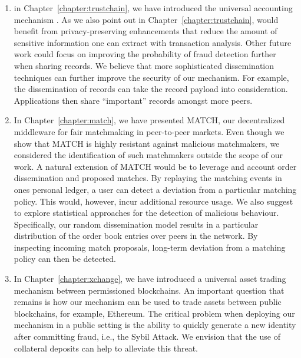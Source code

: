 \begin{enumerate}
	\item in Chapter~\ref{chapter:trustchain}, we have introduced the universal accounting mechanism \TrustChain{}.
	As we also point out in Chapter~\ref{chapter:trustchain}, \TrustChain{} would benefit from privacy-preserving enhancements that reduce the amount of sensitive information one can extract with transaction analysis.
	Other future work could focus on improving the probability of fraud detection further when sharing records.
	We believe that more sophisticated dissemination techniques can further improve the security of our mechanism.
	For example, the dissemination of records can take the record payload into consideration.
	Applications then share \enquote{important} records amongst more peers.
	
	\item In Chapter~\ref{chapter:match}, we have presented MATCH, our decentralized middleware for fair matchmaking in peer-to-peer markets.
	Even though we show that MATCH is highly resistant against malicious matchmakers, we considered the identification of such matchmakers outside the scope of our work.
	A natural extension of MATCH would be to leverage \TrustChain and account order dissemination and proposed matches.
	By replaying the matching events in ones personal ledger, a user can detect a deviation from a particular matching policy.
	This would, however, incur additional resource usage.
	We also suggest to explore statistical approaches for the detection of malicious behaviour.
	Specifically, our random dissemination model results in a particular distribution of the order book entries over peers in the network.
	By inspecting incoming match proposals, long-term deviation from a matching policy can then be detected.
	
	\item In Chapter~\ref{chapter:xchange}, we have introduced a universal asset trading mechanism between permissioned blockchains.
	An important question that remains is how our mechanism can be used to trade assets between public blockchains, for example, Ethereum.
	The critical problem when deploying our mechanism in a public setting is the ability to quickly generate a new identity after committing fraud, i.e., the Sybil Attack.
	We envision that the use of collateral deposits can help to alleviate this threat.
	

\end{enumerate}

